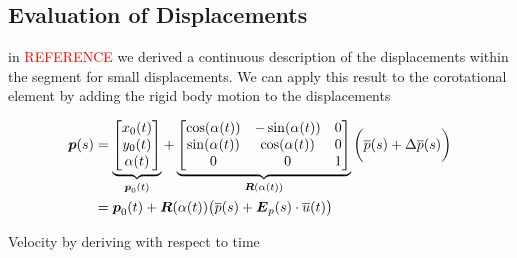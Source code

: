 \newpage
\subsection{Evaluation of Displacements}

in \textcolor{red}{REFERENCE} we derived a continuous description of the displacements within the segment for small displacements.
We can apply this result to the corotational element by adding the rigid body motion to the displacements

\begin{align}
\boldsymbol{p}(s) &=
\underbrace{
\begin{bmatrix}
x_0(t) \\
y_0(t) \\
\alpha(t)
\end{bmatrix}
}_{\boldsymbol{p}_0(t)}
+
\underbrace{
\begin{bmatrix}
\cos(\alpha(t)) & -\sin(\alpha(t)) & 0 \\
\sin(\alpha(t)) & \cos(\alpha(t)) & 0 \\
0 & 0 & 1
\end{bmatrix}
}_{\boldsymbol{R}(\alpha(t))}
\bigg(\overline{p}(s) + \Delta\overline{p}(s)\bigg) \notag \\
&= \boldsymbol{p}_0(t) + \boldsymbol{R}(\alpha(t))\big(\overline{p}(s) + \boldsymbol{E}_p(s)\cdot\overline{u}(t)\big)
\end{align}

Velocity by deriving with respect to time

